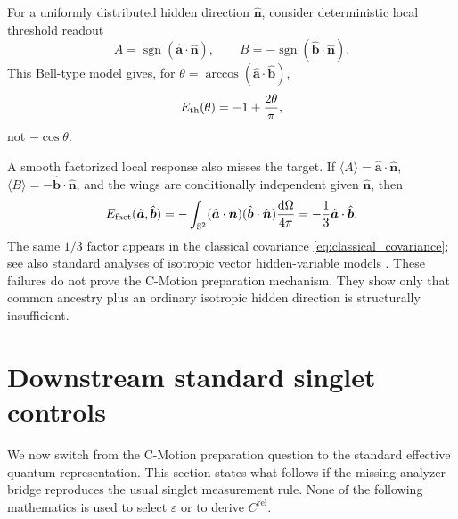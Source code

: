 \documentclass[11pt]{article}
\theoremstyle{remark}
\newcommand{\cmotion}{\mbox{C-Motion}}
\newcommand{\dd}{\mathrm{d}}
\newcommand{\SSph}{\mathbb{S}^{2}}
\newcommand{\sgn}{\operatorname{sgn}}
\newcommand{\ahat}{\hat{\bm a}}
\newcommand{\bhat}{\hat{\bm b}}
\newcommand{\nhat}{\hat{\bm n}}
\newcommand{\epsm}{\varepsilon}
\newcommand{\Crel}{C^{\mathrm{rel}}}
\begin{document}
For a uniformly distributed hidden direction \(\nhat\), consider deterministic local threshold
readout
\begin{equation}
  A=\sgn(\ahat\cdot\nhat),
  \qquad
  B=-\sgn(\bhat\cdot\nhat).
  \label{eq:threshold_model}
\end{equation}
This Bell-type model \cite{Bell1964,CHSH1969} gives, for
\(\theta=\arccos(\ahat\cdot\bhat)\),
\begin{equation}
  E_{\rm th}(\theta)=-1+\frac{2\theta}{\pi},
  \label{eq:threshold_result}
\end{equation}
not \(-\cos\theta\).

A smooth factorized local response also misses the target.  If
\(\langle A\rangle=\ahat\cdot\nhat\),
\(\langle B\rangle=-\bhat\cdot\nhat\), and the wings are conditionally independent given
\(\nhat\), then
\begin{equation}
  E_{\rm fact}(\ahat,\bhat)
  =-\int_{\SSph}(\ahat\cdot\nhat)(\bhat\cdot\nhat)
  \frac{\dd\Omega}{4\pi}
  =-\frac13\ahat\cdot\bhat.
  \label{eq:factorized_result}
\end{equation}
The same \(1/3\) factor appears in the classical covariance \eqref{eq:classical_covariance}; see also
standard analyses of isotropic vector hidden-variable models \cite{GhirardiRomano2012}.  These
failures do not prove the \cmotion{} preparation mechanism.  They show only that common ancestry plus
an ordinary isotropic hidden direction is structurally insufficient.

\section{Downstream standard singlet controls}
\label{sec:standard_control}

We now switch from the \cmotion{} preparation question to the standard effective quantum
representation.  This section states what follows if the missing analyzer bridge reproduces the
usual singlet measurement rule.  None of the following mathematics is used to select \(\epsm\) or to
derive \(\Crel\).
\end{document}

